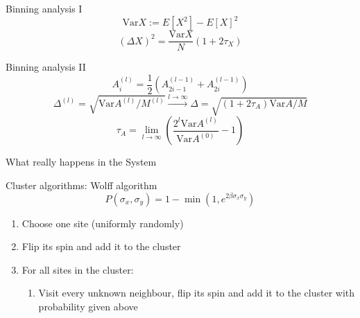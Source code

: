 \documentclass[]{beamer}
\begin{document}
\begin{frame}{Binning analysis I}
\pause
\[ \text{Var} X := E \left[ X^2 \right] - E \left[ X \right]^2 \]
\pause
\[ (\Delta X)^2 = \frac{\text{Var}X}{N}\left(1+2\tau_X\right) \]
\end{frame}

\begin{frame}{Binning analysis II}
\pause
\[ A_i^{(l)} = \frac{1}{2} \left( A_{2i-1}^{(l-1)} + A_{2i}^{(l-1)} \right) \]
\pause
\[ \Delta^{(l)} = \sqrt{\text{Var}A^{(l)}/M^{(l)}}  \stackrel{l \rightarrow \infty}{\rightarrow} \Delta = \sqrt{(1+2\tau_A)\text{Var}A/M} \]
\pause
\[ \tau_A = \lim_{l\rightarrow\infty}\left( \frac{2^l \text{Var} A^{(l)}}{\text{Var} A^{(0)}} - 1 \right) \]
\end{frame}

\begin{frame}{What really happens in the System}
\end{frame}

\begin{frame}{Cluster algorithms: Wolff algorithm}
\[ P(\sigma_x, \sigma_y) = 1 - \min \left( 1,e^{2\beta \sigma_x \sigma_y} \right) \]
\begin{enumerate}
\item<2-> Choose one site (uniformly randomly)
\item<3-> Flip its spin and add it to the cluster
\item<4-> For all sites in the cluster:
	\begin{enumerate}
	\item Visit every unknown neighbour, flip its spin and add it to the cluster with probability given above
	\end{enumerate}
\end{enumerate}
\end{frame}
\end{document}
